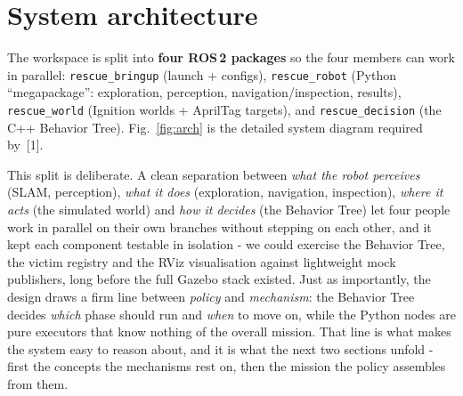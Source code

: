 \documentclass[11pt,a4paper]{article}
\begin{document}
\section{System architecture}
The workspace is split into \textbf{four ROS\,2 packages} so the four members can work in parallel:
\texttt{rescue\_bringup} (launch + configs), \texttt{rescue\_robot} (Python ``megapackage'':
exploration, perception, navigation/inspection, results), \texttt{rescue\_world} (Ignition worlds +
AprilTag targets), and \texttt{rescue\_decision} (the C++ Behavior Tree). Fig.~\ref{fig:arch} is the
detailed system diagram required by~[1].

This split is deliberate. A clean separation between \emph{what the robot perceives} (SLAM, perception),
\emph{what it does} (exploration, navigation, inspection), \emph{where it acts} (the simulated world)
and \emph{how it decides} (the Behavior Tree) let four people work in parallel on their own branches
without stepping on each other, and it kept each component testable in isolation - we could exercise
the Behavior Tree, the victim registry and the RViz visualisation against lightweight mock publishers,
long before the full Gazebo stack existed. Just as importantly, the design draws a firm line between
\emph{policy} and \emph{mechanism}: the Behavior Tree decides \emph{which} phase should run and \emph{when}
to move on, while the Python nodes are pure executors that know nothing of the overall mission. That line
is what makes the system easy to reason about, and it is what the next two sections unfold - first the concepts the mechanisms rest on, then the mission the policy assembles from them.
\end{document}
